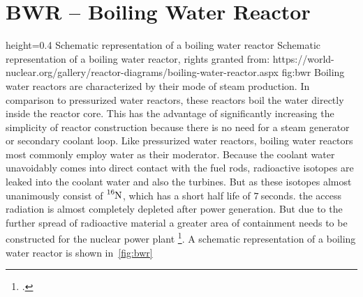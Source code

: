 \section{BWR – Boiling Water Reactor}
    {height=0.4\textheight}
    {Schematic representation of a boiling water reactor}
    {Schematic representation of a boiling water reactor, rights granted from: https://world-nuclear.org/gallery/reactor-diagrams/boiling-water-reactor.aspx}
    {fig:bwr}
Boiling water reactors are characterized by their mode of steam production. In comparison to pressurized
water reactors, these reactors boil the water directly inside the reactor core. This has the advantage
of significantly increasing the simplicity of reactor construction because there is no need for a steam
generator or secondary coolant loop. Like pressurized water reactors, boiling water reactors most commonly
employ water as their moderator. Because the coolant water unavoidably comes into direct contact with
the fuel rods, radioactive isotopes are leaked into the coolant water and also the turbines. But 
as these isotopes almost unanimously consist of $\ce{^{16}N}$, which has a short half life of $7~$seconds.
the access radiation is almost completely depleted after power generation. But due to the further
spread of radioactive material a greater area of containment needs to be constructed for the nuclear
power plant \footcite[85-140]{engHandbook}. A schematic representation of a boiling water reactor
is shown in~\ref{fig:bwr}
\pagebreak
